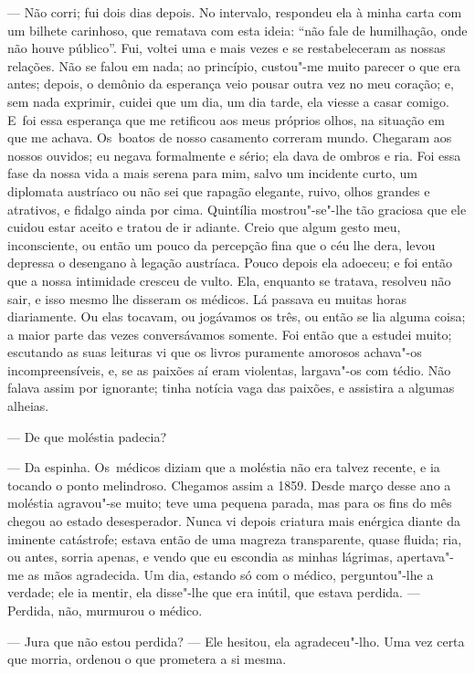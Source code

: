 \begin{linenumbers}
--- Não corri; fui dois dias depois. No intervalo, respondeu ela à minha
carta com um bilhete carinhoso, que rematava com esta ideia: ``não fale
de humilhação, onde não houve público''. Fui, voltei uma e mais vezes e
se restabeleceram as nossas relações. Não se falou em nada; ao
princípio, custou"-me muito parecer o que era antes; depois, o demônio da
esperança veio pousar outra vez no meu coração; e, sem nada exprimir,
cuidei que um dia, um dia tarde, ela viesse a casar comigo. E~foi essa
esperança que me retificou aos meus próprios olhos, na situação em que
me achava. Os~boatos de nosso casamento correram mundo. Chegaram aos
nossos ouvidos; eu negava formalmente e sério; ela dava de ombros e ria.
Foi essa fase da nossa vida a mais serena para mim, salvo um incidente
curto, um diplomata austríaco ou não sei que rapagão elegante, ruivo,
olhos grandes e atrativos, e fidalgo ainda por cima. Quintília
mostrou"-se"-lhe tão graciosa que ele cuidou estar aceito e tratou de ir
adiante. Creio que algum gesto meu, inconsciente, ou então um pouco da
percepção fina que o céu lhe dera, levou depressa o desengano à legação
austríaca. Pouco depois ela adoeceu; e foi então que a nossa intimidade
cresceu de vulto. Ela, enquanto se tratava, resolveu não sair, e isso
mesmo lhe disseram os médicos. Lá passava eu muitas horas diariamente.
Ou elas tocavam, ou jogávamos os três, ou então se lia alguma coisa; a
maior parte das vezes conversávamos somente. Foi então que a estudei
muito; escutando as suas leituras vi que os livros puramente amorosos
achava"-os incompreensíveis, e, se as paixões aí eram violentas,
largava"-os com tédio. Não falava assim por ignorante; tinha notícia vaga
das paixões, e assistira a algumas alheias.

--- De que moléstia padecia?

--- Da espinha. Os~médicos diziam que a moléstia não era talvez recente,
e ia tocando o ponto melindroso. Chegamos assim a 1859. Desde março
desse ano a moléstia agravou"-se muito; teve uma pequena parada, mas para
os fins do mês chegou ao estado desesperador. Nunca vi depois criatura
mais enérgica diante da iminente catástrofe; estava então de uma magreza
transparente, quase fluida; ria, ou antes, sorria apenas, e vendo que eu
escondia as minhas lágrimas, apertava"-me as mãos agradecida. Um dia,
estando só com o médico, perguntou"-lhe a verdade; ele ia mentir, ela
disse"-lhe que era inútil, que estava perdida. --- Perdida, não, murmurou
o médico.

--- Jura que não estou perdida? --- Ele hesitou, ela agradeceu"-lho. Uma
vez certa que morria, ordenou o que prometera a si mesma.


\end{linenumbers}
